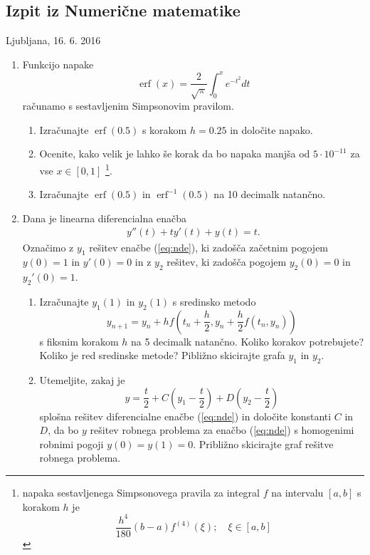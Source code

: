 \documentclass[slovene,12pt]{article}
\DeclareMathOperator*\erf{erf}
\begin{document}
\begin{center}
\section*{Izpit iz Numerične matematike}

Ljubljana, 16. 6. 2016
\end{center}
\pagestyle{empty}

\begin{enumerate}
\item Funkcijo napake  
\[\erf(x)=\frac{2}{\sqrt{\pi}}\int_0^xe^{-t^2}dt\] 
računamo s sestavljenim Simpsonovim pravilom.
 \begin{enumerate}
 \item Izračunajte $\erf(0.5)$ s korakom $h=0.25$ in določite napako.
 \item Ocenite, kako velik je lahko še korak  da bo napaka
   manjša od $5\cdot 10^{-11}$ za vse $x\in[0,1]$ \footnote[1]{napaka
     sestavljenega Simpsonovega pravila za integral $f$
   na intervalu $[a,b]$ s korakom $h$ je
\[\frac{h^4}{180}(b-a)f^{(4)}(\xi);\quad \xi\in[a,b]\]}.
 \item Izračunajte $\erf(0.5)$ in $\erf^{-1}(0.5)$ na 10 decimalk natančno.
 \end{enumerate}

\item Dana je linearna diferencialna enačba
  \begin{eqnarray}
    \label{eq:nde}
    y''(t) + t y'(t) + y(t) = t.
  \end{eqnarray}
  Označimo z $y_1$ rešitev enačbe (\ref{eq:nde}), ki zadošča začetnim pogojem
  $y(0)=1$ in $y'(0)=0$ in z $y_2$ rešitev, ki zadošča pogojem $y_2(0)=0$ in $y_2'(0)=1$. 
\begin{enumerate}
   \item Izračunajte $y_1(1)$ in $y_2(1)$ s sredinsko metodo
     \[y_{n+1} = y_n +  hf\left(t_n+\frac{h}{2},y_{n}+\frac{h}{2}f(t_n,y_{n})\right)\]
     s fiksnim korakom $h$ na 5 decimalk natančno. Koliko korakov potrebujete?
     Koliko je red sredinske metode? Pibližno skicirajte grafa $y_1$ in $y_2$.
   \item Utemeljite, zakaj je 
\[y = \frac{t}{2} + C(y_1-\frac{t}{2}) + D(y_2-\frac{t}{2})\] 
splošna rešitev diferencialne enačbe
     (\ref{eq:nde}) in določite konstanti $C$ in $D$, da bo $y$ rešitev robnega
     problema za enačbo (\ref{eq:nde}) s homogenimi robnimi pogoji
     $y(0)=y(1)=0$. Približno skicirajte graf rešitve robnega problema. 
  \end{enumerate}
\end{enumerate}
\end{document}
